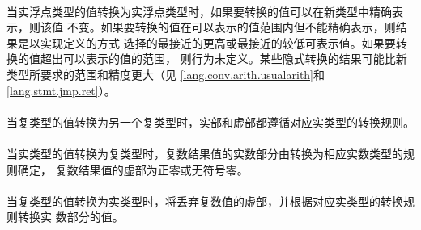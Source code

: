 \paragraph{}
当实浮点类型的值转换为实浮点类型时，如果要转换的值可以在新类型中精确表示，则该值
不变。如果要转换的值在可以表示的值范围内但不能精确表示，则结果是以实现定义的方式
选择的最接近的更高或最接近的较低可表示值。如果要转换的值超出可以表示的值的范围，
则行为未定义。某些隐式转换的结果可能比新类型所要求的范围和精度更大（见
\ref{lang.conv.arith.usualarith}和\ref{lang.stmt.jmp.ret}）。

\paragraph{}
当复类型的值转换为另一个复类型时，实部和虚部都遵循对应实类型的转换规则。

\paragraph{}
当实类型的值转换为复类型时，复数结果值的实数部分由转换为相应实数类型的规则确定，
复数结果值的虚部为正零或无符号零。

\paragraph{}
当复类型的值转换为实类型时，将丢弃复数值的虚部，并根据对应实类型的转换规则转换实
数部分的值。

